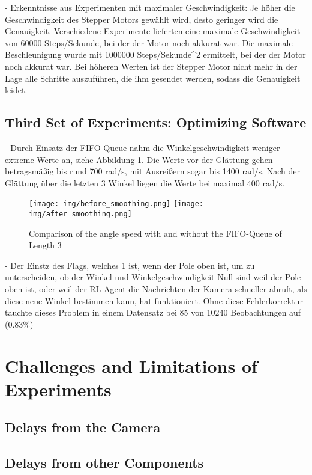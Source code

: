 - Erkenntnisse aus Experimenten mit maximaler Geschwindigkeit: Je höher die Geschwindigkeit des Stepper Motors gewählt wird, desto geringer wird die Genauigkeit. Verschiedene Experimente lieferten eine maximale Geschwindigkeit von 60000 Steps/Sekunde, bei der der Motor noch akkurat war. Die maximale Beschleunigung wurde mit 1000000 Steps/Sekunde^2 ermittelt, bei der der Motor noch akkurat war. Bei höheren Werten ist der Stepper Motor nicht mehr in der Lage alle Schritte auszuführen, die ihm gesendet werden, sodass die Genauigkeit leidet.

\subsection{Third Set of Experiments: Optimizing Software}
- Durch Einsatz der FIFO-Queue nahm die Winkelgeschwindigkeit weniger extreme Werte an, siehe Abbildung \ref{fig:before_after_smoothing}. Die Werte vor der Glättung gehen betragsmäßig bis rund 700 rad/s, mit Ausreißern sogar bis 1400 rad/s. Nach der Glättung über die letzten 3 Winkel liegen die Werte bei maximal 400 rad/s.
\begin{figure}[htbp]
    \centering
    \texttt{[image: img/before\_smoothing.png]}
    \texttt{[image: img/after\_smoothing.png]}
    \caption{Comparison of the angle speed with and without the FIFO-Queue of Length 3}
    \label{fig:before_after_smoothing}
\end{figure}
- Der Einstz des Flags, welches 1 ist, wenn der Pole oben ist, um zu unterscheiden, ob der Winkel und Winkelgeschwindigkeit Null sind weil der Pole oben ist, oder weil der RL Agent die Nachrichten der Kamera schneller abruft, als diese neue Winkel bestimmen kann, hat funktioniert. Ohne diese Fehlerkorrektur tauchte dieses Problem in einem Datensatz bei 85 von 10240 Beobachtungen auf (0.83\%)

\section{Challenges and Limitations of Experiments}

\subsection{Delays from the Camera}

\subsection{Delays from other Components}